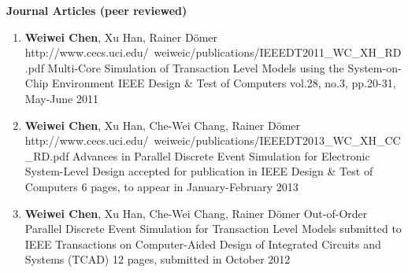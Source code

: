 

%
%



{\textbf{\large Journal Articles (peer reviewed)}}
\vspace{-2mm}
\begin{enumerate}

\item 
	\mypubhl
	{\textbf{Weiwei Chen}, Xu Han, Rainer D\"{o}mer}
	{http://www.cecs.uci.edu/~weiweic/publications/IEEEDT2011_WC_XH_RD.pdf}
	{Multi-Core Simulation of Transaction Level Models using the System-on-Chip Environment}
	{}
	{IEEE Design \& Test of Computers}
	{vol.28, no.3, pp.20-31, May-June 2011}
		
\item 
	\mypubhl
	{\textbf{Weiwei Chen}, Xu Han, Che-Wei Chang, Rainer D\"{o}mer}
	{http://www.cecs.uci.edu/~weiweic/publications/IEEEDT2013_WC_XH_CC_RD.pdf}
	{Advances in Parallel Discrete Event Simulation for Electronic System-Level Design} 
	{accepted for publication in }
	{IEEE Design \& Test of Computers}
	{6 pages, to appear in January-February 2013}
	
\item  
	\mypub
	{\textbf{Weiwei Chen}, Xu Han, Che-Wei Chang, Rainer D\"{o}mer}
	{Out-of-Order Parallel Discrete Event Simulation for Transaction Level Models} 
	{submitted to }
	{IEEE Transactions on Computer-Aided Design of Integrated Circuits and Systems (TCAD)} 
	{12 pages, submitted in October 2012}
	
\end{enumerate}

